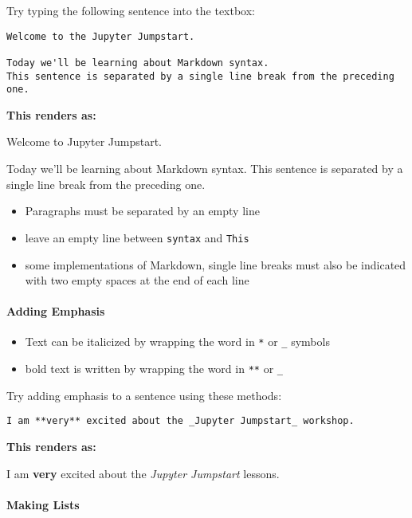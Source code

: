\documentclass{article}
\providecommand{\tightlist}{%
      \setlength{\itemsep}{0pt}\setlength{\parskip}{0pt}}
\begin{document}
Try typing the following sentence into the textbox:

\begin{verbatim}
Welcome to the Jupyter Jumpstart.

Today we'll be learning about Markdown syntax.
This sentence is separated by a single line break from the preceding one.
\end{verbatim}

    \textbf{This renders as:}

Welcome to Jupyter Jumpstart.

Today we'll be learning about Markdown syntax. This sentence is
separated by a single line break from the preceding one.

    \begin{itemize}
\tightlist
\item
  Paragraphs must be separated by an empty line
\item
  leave an empty line between \texttt{syntax} and \texttt{This}
\item
  some implementations of Markdown, single line breaks must also be
  indicated with two empty spaces at the end of each line
\end{itemize}

    \paragraph{Adding Emphasis}\label{adding-emphasis}

    \begin{itemize}
\tightlist
\item
  Text can be italicized by wrapping the word in \texttt{*} or
  \texttt{\_} symbols
\item
  bold text is written by wrapping the word in \texttt{**} or
  \texttt{\_}
\end{itemize}

    Try adding emphasis to a sentence using these methods:

\begin{verbatim}
I am **very** excited about the _Jupyter Jumpstart_ workshop.
\end{verbatim}

    \textbf{This renders as:}

I am \textbf{very} excited about the \emph{Jupyter Jumpstart} lessons.

    \paragraph{Making Lists}\label{making-lists}
\end{document}

